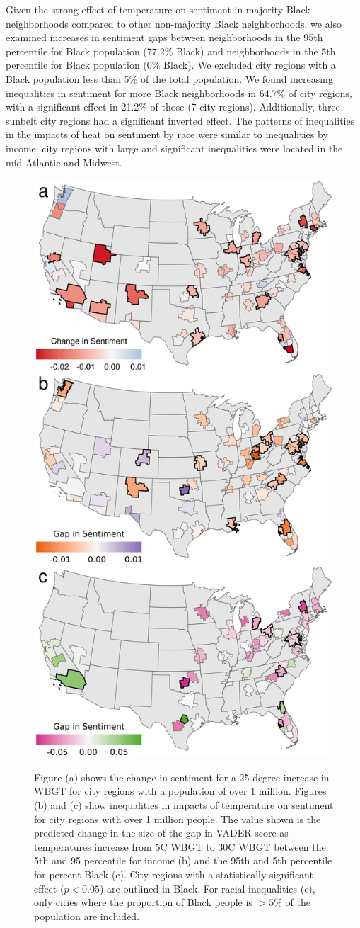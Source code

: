 \documentclass[fleqn,10pt]{wlscirep}
\begin{document}
Given the strong effect of temperature on sentiment in majority Black neighborhoods compared to other non-majority Black neighborhoods, we also examined increases in sentiment gaps between neighborhoods in the 95th percentile for Black population (77.2\% Black) and neighborhoods in the 5th percentile for Black population (0\% Black). We excluded city regions with a Black population less than 5\% of the total population. We found increasing inequalities in sentiment for more Black neighborhoods in 64.7\% of city regions, with a significant effect in 21.2\% of those (7 city regions).  Additionally, three sunbelt city regions had a significant inverted effect. The patterns of inequalities in the impacts of heat on sentiment by race were similar to inequalities by income: city regions with large and significant inequalities were located in the mid-Atlantic and Midwest.

\begin{figure}[H]
\centering
  \includegraphics[width=0.5\linewidth]{../res/map_combined.png}
  \label{fig:map}
    \caption{Figure (a) shows the change in sentiment for a 25-degree increase in WBGT for city regions with a population of over 1 million.  Figures (b) and (c) show inequalities in impacts of temperature on sentiment for city regions with over 1 million people.  The value shown is the predicted change in the size of the gap in VADER score as temperatures increase from 5\textdegree C WBGT to 30\textdegree C WBGT between the 5th and 95 percentile for income (b) and the 95th and 5th percentile for percent Black (c). City regions with a statistically significant effect ($p < 0.05$) are outlined in Black.  For racial inequalities (c), only cities where the proportion of Black people is $> 5\%$ of the population are included.}
\end{figure}
\end{document}
